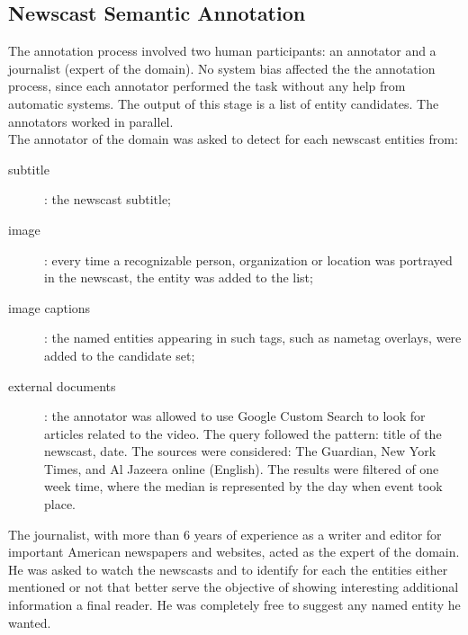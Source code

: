 \documentclass{llncs}
\begin{document}
\subsection{Newscast Semantic Annotation}
The annotation process involved two human participants: an annotator and a journalist (expert of the domain). No system bias affected the the annotation process, since each annotator performed the task without any help from automatic systems. The output of this stage is a list of entity candidates. The annotators worked in parallel.
\\The annotator of the domain was asked to detect for each newscast entities from: 
\begin{description}
\item[subtitle]: the newscast subtitle;
\item[image]: every time a recognizable person, organization or location was portrayed in the newscast, the entity was added to the list;
\item[image captions]: the named entities appearing in such tags, such as nametag overlays, were added to the candidate set;
\item[external documents]: the annotator was allowed to use Google Custom Search to look for articles related to the video. The query followed the pattern: title of the newscast, date. The sources were considered: The Guardian, New York Times, and Al Jazeera online (English). The results were filtered of one week time, where the median is represented by the day when event took place.
\end{description}
The journalist, with more than 6 years of experience as a writer and editor for important American newspapers and websites, acted as the expert of the domain. He was asked to watch the newscasts and to identify for each the entities either mentioned or not that better serve the objective of showing interesting additional information a final reader. He was completely free to suggest any named entity he wanted. 
\end{document}
